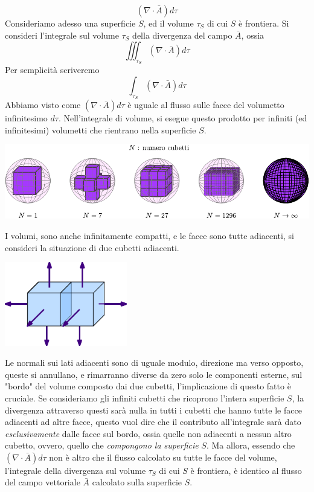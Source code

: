 \documentclass[10pt, letterpaper]{report}
\begin{document}
$$ (\nabla \cdot \bar A)d\tau$$
Consideriamo adesso una superficie $S$, ed il volume $\tau_S$ di cui $S$ è frontiera. Si consideri l'integrale sul volume $\tau_S$ della divergenza del campo $\bar A$, ossia 
$$ \iiint_{\tau_S}(\nabla \cdot \bar A)d\tau$$
Per semplicità scriveremo 
$$ \int_{\tau_S}(\nabla \cdot \bar A)d\tau$$
Abbiamo visto come $(\nabla \cdot \bar A)d\tau$ è uguale al flusso sulle facce del volumetto infinitesimo $d\tau$. Nell'integrale di volume, si esegue questo prodotto per infiniti (ed infinitesimi) volumetti che rientrano nella superficie $S$.
\begin{center}
    \includegraphics[width=\textwidth]{images/teoDiv.pdf}
\end{center}
I volumi, sono anche infinitamente compatti, e le facce sono tutte adiacenti, si consideri la situazione di due cubetti adiacenti.
\begin{center}
    \includegraphics[width=0.4\textwidth]{images/IntDiv2.eps}
\end{center}
Le normali sui lati adiacenti sono di uguale modulo, direzione ma verso opposto, queste si annullano, e rimarranno diverse da zero solo le componenti esterne, sul "bordo" del volume composto dai due cubetti, l'implicazione di questo fatto è cruciale. \acc Se consideriamo gli infiniti cubetti che ricoprono l'intera superficie $S$, la divergenza attraverso questi sarà nulla in tutti i cubetti che hanno tutte le facce adiacenti ad altre facce, questo vuol dire che il contributo all'integrale sarà dato \textit{esclusivamente} dalle facce sul bordo, ossia quelle non adiacenti a nessun altro cubetto, ovvero, quello che \textit{compongono la superficie} $S$.\acc 
Ma allora, essendo che $(\nabla \cdot \bar A)d\tau$ non è altro che il flusso calcolato su tutte le facce del volume, l'integrale della divergenza sul volume $\tau_S$ di cui $S$ è frontiera, è identico al flusso del campo vettoriale $\bar A$ calcolato sulla superficie $S$. \acc 
\end{document}
